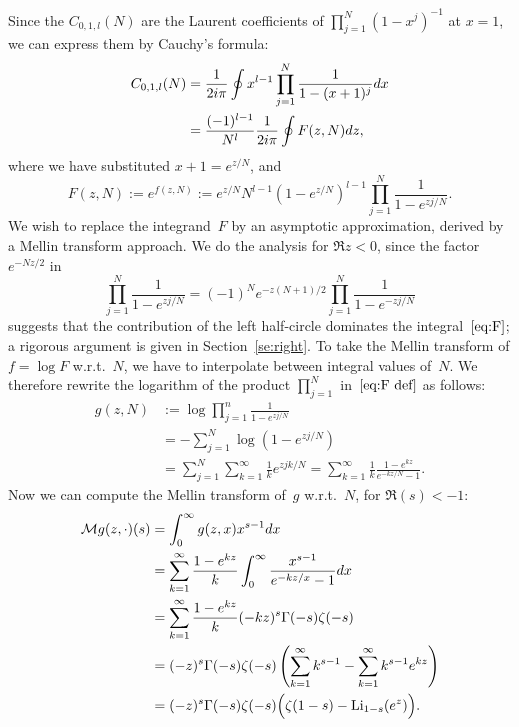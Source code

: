 \documentclass[a4paper]{amsart}
\begin{document}
Since the $C_{0,1,l}(N)$ are the Laurent coefficients of
$\prod_{j=1}^N (1-x^j)^{-1}$ at $x=1$, we
can express them by Cauchy's formula:
\begin{align}
   C_{0,1,l}(N) &= \frac{1}{2i\pi} \oint x^{l-1} \prod_{j=1}^N \frac{1}{1-(x+1)^j}dx \notag \\
   & =  \frac{(-1)^{l-1}}{N^l} \frac{1}{2i\pi} \oint F(z,N) dz, \label{eq:F}
\end{align}
where we have substituted $x+1=e^{z/N}$, and
\begin{equation}\label{eq:F def}
  F(z,N) := e^{f(z,N)} := e^{z/N}N^{l-1}(1-e^{z/N})^{l-1}\prod_{j=1}^N \frac{1}{1-e^{zj/N}}.
\end{equation}
We wish to replace the integrand~$F$ by an asymptotic approximation, 
derived by a Mellin transform approach.
We do the analysis for $\Re z<0$, since the factor~$e^{-Nz/2}$ in
\begin{equation}\label{eq:refl}
  \prod_{j=1}^N \frac 1{1-e^{zj/N}} 
  = (-1)^N e^{-z(N+1)/2} \prod_{j=1}^N \frac 1{1-e^{-zj/N}}
\end{equation}
suggests that the contribution of the left half-circle dominates
the integral~$\eqref{eq:F}$; a rigorous argument is given in Section~\ref{se:right}.
To take the Mellin transform of $f=\log F$ w.r.t.~$N$, we have to interpolate between integral values of~$N$. We therefore rewrite the
logarithm of the product $\prod_{j=1}^N$ in~$\eqref{eq:F def}$ as follows:
\begin{align*}
 g(z,N)  &:= \log \prod_{j=1}^n  \frac{1}{1-e^{zj/N}} \\ 
 &= - \sum_{j=1}^N \log(1-e^{zj/N}) \\
  &= \sum_{j=1}^N \sum_{k=1}^\infty \frac{1}{k}e^{zjk/N} 
 = \sum_{k=1}^\infty \frac{1}{k} \frac{1-e^{kz}}{e^{-kz/N}-1}.
\end{align*}
Now we can compute the Mellin transform of~$g$ w.r.t.~$N$, for $\Re(s)<-1$:
\begin{align}
 \mathcal{M}g(z,\cdot)(s)&=\int_0^\infty g(z,x)x^{s-1}dx \notag \\
&=  \sum_{k=1}^\infty \frac{1-e^{kz}}{k}
    \int_0^\infty \frac{x^{s-1}}{e^{-kz/x}-1} dx \notag \\
  &= \sum_{k=1}^\infty  \frac{1-e^{kz}}{k} (-kz)^s \Gamma(-s)\zeta(-s) \notag \\
  &= (-z)^s \Gamma(-s)\zeta(-s) \left(\sum_{k=1}^\infty k^{s-1}
  - \sum_{k=1}^\infty  k^{s-1} e^{kz}  \right) \notag \\
  &= (-z)^s \Gamma(-s)\zeta(-s) \Big(\zeta(1-s) - \mathrm{Li}_{1-s}(e^z)\Big).
  \label{eq:mellin}
\end{align}
\end{document}

